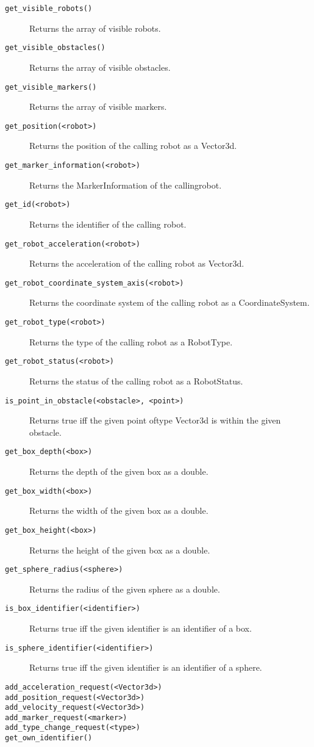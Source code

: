 \begin{description}
	\item [\texttt{get\_visible\_robots()}] Returns the array of visible robots.
	\item [\texttt{get\_visible\_obstacles()}] Returns the array of visible obstacles.
	\item [\texttt{get\_visible\_markers()}] Returns the array of visible markers.
	\item [\texttt{get\_position(<robot>)}] Returns the position of the calling robot as a Vector3d.
	\item [\texttt{get\_marker\_information(<robot>)}] Returns the MarkerInformation of the calling\linebreak robot.
	\item [\texttt{get\_id(<robot>)}] Returns the identifier of the calling robot.
	\item [\texttt{get\_robot\_acceleration(<robot>)}] Returns the acceleration of the calling robot as Vector3d.
	\item [\texttt{get\_robot\_coordinate\_system\_axis(<robot>)}] Returns the coordinate system of the calling robot as a CoordinateSystem.
	\item [\texttt{get\_robot\_type(<robot>)}] Returns the type of the calling robot as a RobotType.
	\item [\texttt{get\_robot\_status(<robot>)}] Returns the status of the calling robot as a RobotStatus.
	\item [\texttt{is\_point\_in\_obstacle(<obstacle>, <point>)}] Returns true iff the given point of\linebreak type Vector3d is within the given obstacle.
	\item [\texttt{get\_box\_depth(<box>)}] Returns the depth of the given box as a double.
	\item [\texttt{get\_box\_width(<box>)}] Returns the width of the given box as a double.
	\item [\texttt{get\_box\_height(<box>)}] Returns the height of the given box as a double.
	\item [\texttt{get\_sphere\_radius(<sphere>)}] Returns the radius of the given sphere as a double.
	\item [\texttt{is\_box\_identifier(<identifier>)}] Returns true iff the given identifier is an identifier of a box.
	\item [\texttt{is\_sphere\_identifier(<identifier>)}] Returns true iff the given identifier is an identifier of a sphere.
	\item [\texttt{add\_acceleration\_request(<Vector3d>)}] 
	\item [\texttt{add\_position\_request(<Vector3d>)}]
	\item [\texttt{add\_velocity\_request(<Vector3d>)}]
	\item [\texttt{add\_marker\_request(<marker>)}]
	\item [\texttt{add\_type\_change\_request(<type>)}]
	\item [\texttt{get\_own\_identifier()}]
\end{description}

